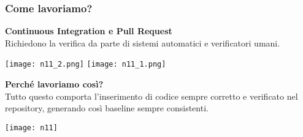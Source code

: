 \begin{frame}
\frametitle{Come lavoriamo?}
  	\textbf{Continuous Integration e Pull Request}\\
  	Richiedono la verifica da parte di sistemi automatici e verificatori umani.\\
	\begin{flushright}
		\texttt{[image: n11\_2.png]}	 	
  		\texttt{[image: n11\_1.png]}
	\end{flushright}
  	\par \textbf{Perché lavoriamo così?}\\ 
  	Tutto questo comporta l’inserimento di codice
sempre corretto e verificato nel repository, generando così baseline sempre consistenti.
	\begin{flushright}
		\texttt{[image: n11]}
	\end{flushright}
\end{frame}


